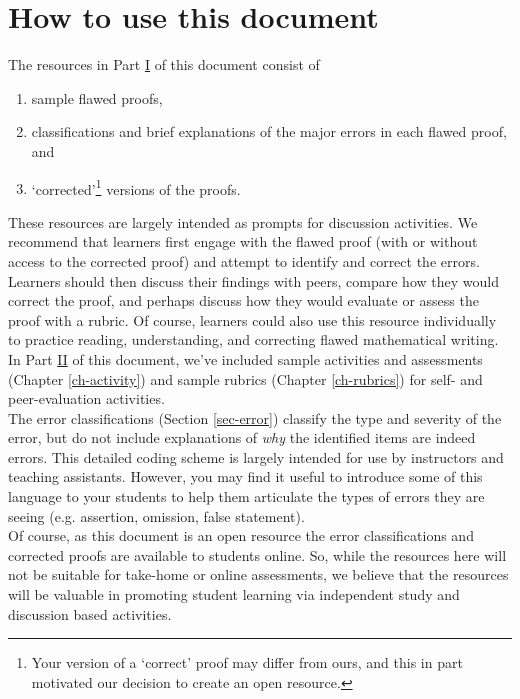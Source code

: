 \documentclass[12pt]{book}
\begin{document}
\section{How to use this document}\label{sec-how-to}
The resources in Part \hyperref[part-proofs]{I} of this document consist of
\begin{enumerate}
	\item sample flawed proofs,
	\item classifications and brief explanations of the major errors in each flawed proof, and
	\item `corrected'\footnote{Your version of a `correct' proof may differ from ours, and this in part motivated our decision to create an open resource.} versions of the proofs.
\end{enumerate}
These resources are largely intended as prompts for discussion activities.  We recommend that learners first engage with the flawed proof (with or without access to the corrected proof) and attempt to identify and correct the errors. Learners should then discuss their findings with peers, compare how they would correct the proof, and perhaps discuss how they would evaluate or assess the proof with a rubric.  Of course, learners could also use this resource individually to practice reading, understanding, and correcting flawed mathematical writing. \\

In Part \hyperref[part-additional]{II} of this document, we've included sample activities and assessments (Chapter \ref{ch-activity}) and sample rubrics (Chapter \ref{ch-rubrics})  for self- and peer-evaluation activities. \\

The error classifications (Section \ref{sec-error}) classify the type and severity of the error, but do not include explanations of \emph{why} the identified items are indeed errors. This detailed coding scheme is largely intended for use by instructors and teaching assistants. However, you may find it useful to introduce some of this language to your students to help them articulate the types of errors they are seeing (e.g. assertion, omission, false statement). \\

Of course, as this document is an open resource the error classifications and corrected proofs are available to students online.  So, while the resources here will not be suitable for take-home or online assessments, we believe that the resources will be valuable in promoting student learning via independent study and discussion based activities.
\end{document}
